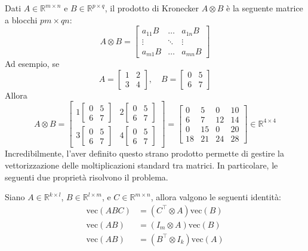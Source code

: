 \documentclass[11pt, a4paper]{article}
\begin{document}
Dati $A \in \mathbb{R}^{m \times n}$ e $B \in \mathbb{R}^{p \times q}$, il prodotto di Kronecker $A \otimes B$ è la seguente matrice a blocchi $pm \times qn$:
\[
A \otimes B =
\begin{bmatrix}
a_{11}B & \dots & a_{1n}B \\
\vdots & \ddots & \vdots \\
a_{m1}B & \dots & a_{mn}B
\end{bmatrix}
\]
Ad esempio, se
\[
A = \begin{bmatrix} 1 & 2 \\ 3 & 4 \end{bmatrix}, \quad B = \begin{bmatrix} 0 & 5 \\ 6 & 7 \end{bmatrix}
\]
Allora
\[
A \otimes B =
\begin{bmatrix}
1 \begin{bmatrix} 0 & 5 \\ 6 & 7 \end{bmatrix} & 2 \begin{bmatrix} 0 & 5 \\ 6 & 7 \end{bmatrix} \\
3 \begin{bmatrix} 0 & 5 \\ 6 & 7 \end{bmatrix} & 4 \begin{bmatrix} 0 & 5 \\ 6 & 7 \end{bmatrix}
\end{bmatrix} =
\begin{bmatrix}
0 & 5 & 0 & 10 \\
6 & 7 & 12 & 14 \\
0 & 15 & 0 & 20 \\
18 & 21 & 24 & 28
\end{bmatrix} \in \mathbb{R}^{4 \times 4}
\]
Incredibilmente, l'aver definito questo strano prodotto permette di gestire la vettorizzazione delle moltiplicazioni standard tra matrici. In particolare, le seguenti due proprietà risolvono il problema.

Siano $A \in \mathbb{R}^{k \times l}$, $B \in \mathbb{R}^{l \times m}$, e $C \in \mathbb{R}^{m \times n}$, allora valgono le seguenti identità:
\begin{align}
\text{vec}(ABC) &= (C^\top \otimes A)\text{vec}(B) \tag{4a} \\
\text{vec}(AB) &= (I_m \otimes A)\text{vec}(B) \tag{4b} \\
\text{vec}(AB) &= (B^\top \otimes I_k)\text{vec}(A) \tag{4c}
\end{align}
\end{document}
